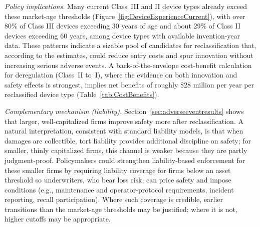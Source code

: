 \documentclass[letterpaper,12pt]{article}
\theoremstyle{definition}
\begin{document}
\textit{Policy implications.} Many current Class~III and II device types already exceed these market-age thresholds (Figure~\ref{fig:DeviceExperienceCurrent}), with over 80\% of Class III devices exceeding 30 years of age and about 29\% of Class II devices exceeding 60 years, among device types with available invention-year data. These patterns indicate a sizable pool of candidates for reclassification that, according to the estimates, could reduce entry costs and spur innovation without increasing serious adverse events. A back-of-the-envelope cost-benefit calculation for deregulation (Class~II to~I), where the evidence on both innovation and safety effects is strongest, implies net benefits of roughly \$28 million per year per reclassified device type (Table~\ref{tab:CostBenefits}).\footnotemark {}


\textit{Complementary mechanism (liability).} Section~\ref{sec:adverseeventresults} shows that larger, well-capitalized firms improve safety more after reclassification. A natural interpretation, consistent with standard liability models, is that when damages are collectible, tort liability provides additional discipline on safety; for smaller, thinly capitalized firms, this channel is weaker because they are partly judgment-proof. Policymakers could strengthen liability-based enforcement for these smaller firms by requiring liability coverage for firms below an asset threshold so underwriters, who bear loss risk, can price safety and impose conditions (e.g., maintenance and operator-protocol requirements, incident reporting, recall participation). Where such coverage is credible, earlier transitions than the market-age thresholds may be justified; where it is not, higher cutoffs may be appropriate.
\end{document}
